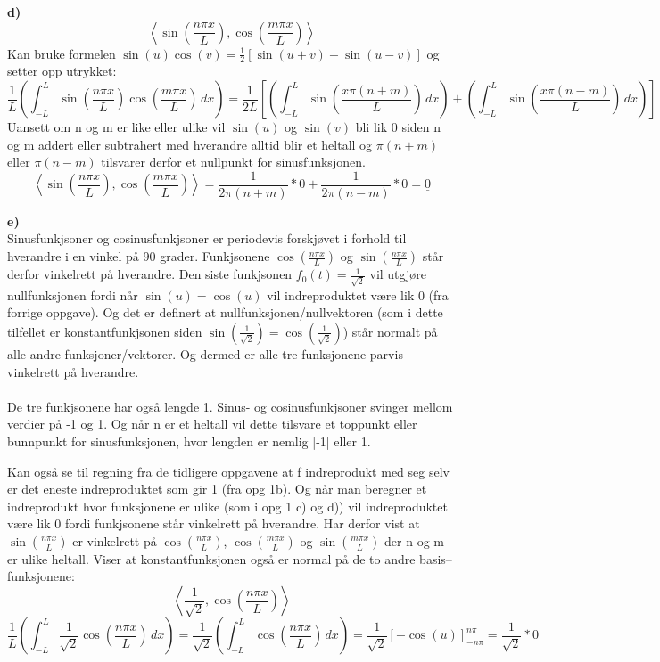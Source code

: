 \documentclass[12pt,norsk,a4paper]{article}
\begin{document}
    \textbf{d)}\\
        \[\left\langle \sin(\frac{n\pi x}{L}),\cos(\frac{m\pi x}{L}) \right\rangle\]
        Kan bruke formelen $\sin(u)\cos(v) = \frac{1}{2}\left[ \sin(u+v)+\sin(u-v) \right]$ og setter opp utrykket:\\
        \[\frac{1}{L}\left(\int_{-L}^{L} \sin(\frac{n\pi x}{L})\cos(\frac{m\pi x}{L})\,dx\right) = \frac{1}{2L}\left[ \left(\int_{-L}^{L} \sin(\frac{x\pi (n+m)}{L})\,dx\right) + \left(\int_{-L}^{L} \sin(\frac{x\pi (n-m)}{L})\,dx\right)\right]\]
        Uansett om n og m er like eller ulike vil $\sin(u)$ og $\sin(v)$ bli lik 0 siden n og m addert eller subtrahert med hverandre alltid blir et heltall og
        $\pi (n+m)$ eller $\pi (n-m)$ tilsvarer derfor et nullpunkt for sinusfunksjonen.
        \[\left\langle \sin(\frac{n\pi x}{L}),\cos(\frac{m\pi x}{L}) \right\rangle = \frac{1}{2\pi (n+m)}*0 + \frac{1}{2\pi(n-m)}*0 = \underline{0}\]

    \textbf{e)}\\
        Sinusfunkjsoner og cosinusfunkjsoner er periodevis forskjøvet i forhold til hverandre i en vinkel på 90 grader. 
        Funkjsonene $\cos(\frac{n\pi x}{L})$ og $\sin(\frac{n\pi x}{L})$ står derfor vinkelrett på hverandre.
        Den siste funkjsonen $f_0(t)=\frac{1}{\sqrt{2}}$ vil utgjøre nullfunksjonen fordi når $\sin (u) = \cos (u)$ vil indreproduktet være lik 0 (fra forrige oppgave).
        Og det er definert at nullfunksjonen/nullvektoren (som i dette tilfellet er konstantfunkjsonen siden $\sin(\frac{1}{\sqrt{2}})=\cos(\frac{1}{\sqrt{2}})$) står normalt på alle andre funksjoner/vektorer. Og dermed er alle tre funksjonene parvis vinkelrett på hverandre.\\\\
        De tre funkjsonene har også lengde 1. Sinus- og cosinusfunkjsoner svinger mellom verdier på -1 og 1. Og når n er et heltall vil dette tilsvare et toppunkt eller bunnpunkt for sinusfunksjonen,
        hvor lengden er nemlig |-1| eller 1.

        Kan også se til regning fra de tidligere oppgavene at f indreprodukt med seg selv er det eneste indreproduktet som gir 1 (fra opg 1b).
        Og når man beregner et indreprodukt hvor funksjonene er ulike (som i opg 1 c) og d)) vil indreproduktet være lik 0 fordi funkjsonene står vinkelrett på hverandre.
        Har derfor vist at $\sin(\frac{n\pi x}{L})$ er vinkelrett på $\cos(\frac{n\pi x}{L})$, $\cos(\frac{m\pi x}{L})$ og $\sin(\frac{m\pi x}{L})$ der n og m er ulike heltall.
        Viser at konstantfunksjonen også er normal på de to andre basis--funksjonene:\\
        \[\left\langle \frac{1}{\sqrt{2}},\cos(\frac{n\pi x}{L}) \right\rangle\]
        \[\frac{1}{L}\left(\int_{-L}^{L} \frac{1}{\sqrt{2}}\cos(\frac{n\pi x}{L})\,dx\right) = \frac{1}{\sqrt{2}}\left(\int_{-L}^{L} \cos(\frac{n\pi x}{L})\,dx\right) = \frac{1}{\sqrt{2}} \left[ -\cos(u) \right]_{-n\pi}^{n\pi} = \frac{1}{\sqrt{2}}*0\]
\end{document}
